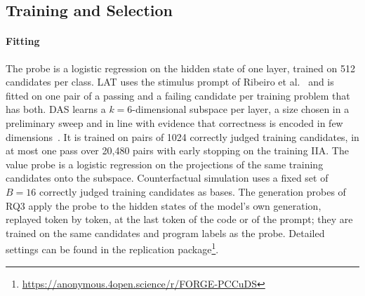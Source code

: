 \subsection{Training and Selection}
\label{sec:setup-training}
\paragraph{Fitting}
The probe is a logistic regression on the hidden state of one layer, trained
on 512 candidates per class. LAT uses the stimulus prompt of Ribeiro et
al.~\cite{ribeiro2026repe} and is fitted on one pair of a passing and a
failing candidate per training problem that has both. DAS learns a
$k {=} 6$-dimensional subspace per layer, a size chosen in a preliminary sweep
and in line with evidence that correctness is encoded in few
dimensions~\cite{cho2026confidencemanifold}. It is trained on pairs of 1024
correctly judged training candidates, in at most one pass over 20,480 pairs
with early stopping on the training IIA. The value probe is a logistic
regression on the projections of the same training candidates onto the subspace.
Counterfactual simulation uses a fixed set of $B {=} 16$ correctly judged
training candidates as bases. The generation probes of RQ3 apply the probe to
the hidden states of the model's own generation, replayed token by token, at
the last token of the code or of the prompt; they are trained on the same
candidates and program labels as the probe. Detailed settings can be found in the replication package\footnote{\url{https://anonymous.4open.science/r/FORGE-PCCuDS}}.

